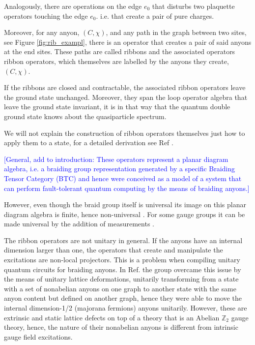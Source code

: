 \documentclass[two column]{article}
\newcommand{\jovan}[1]{\textcolor{blue}{[#1]}}
\begin{document}
Analogously, there are operations on the edge $e_0$ that disturbs two plaquette operators touching the edge $e_0$. i.e. that create a pair of pure charges.

Moreover, for any anyon, $(C, \chi)$, and any path in the graph between two sites, see Figure \ref{fig:rib_exampl}, there is an operator that creates a pair of said anyons at the end sites. These paths are called ribbons and the associated operators ribbon operators, which themselves are labelled by the anyons they create, $(C, \chi)$.

If the ribbons are closed and contractable, the associated ribbon operators leave the ground state unchanged. Moreover, they span the loop operator algebra that leave the ground state invariant, it is in that way that the quantum double ground state knows about the quasiparticle spectrum.

We will not explain the construction of ribbon operators themselves just how to apply them to a state, for a detailed derivation see Ref \cite{Kitaev_2003,cui2018topological}. 

\jovan{General, add to introduction: These operators represent a planar diagram algebra, i.e. a braiding group representation generated by a specific Braiding Tensor Category (BTC) and hence were conceived as a model of a system that can perform fault-tolerant quantum computing by the means of braiding anyons.} 

However, even though the braid group itself is universal its image on this planar diagram algebra is finite, hence non-universal \cite{cui2018topological}. For some gauge groups it can be made universal by the addition of measurements \cite{Cui_2015}.

The ribbon operators are not unitary in general. If the anyons have an internal dimension larger than one, the operators that create and manipulate the excitations are non-local projectors. This is a problem when compiling unitary quantum circuits for braiding anyons. In Ref. \cite{andersen2022observation} the group overcame this issue by the means of unitary lattice deformations, unitarily transforming from a state with a set of nonabelian anyons on one graph to another state with the same anyon content but defined on another graph, hence they were able to move the internal dimension-1/2 (majorana fermions) anyons unitarily. However, these are extrinsic and static lattice defects on top of a theory that is an Abelian $\mathbb Z_2$ gauge theory, hence, the nature of their nonabelian anyons is different from intrinsic gauge field excitations.
\end{document}
